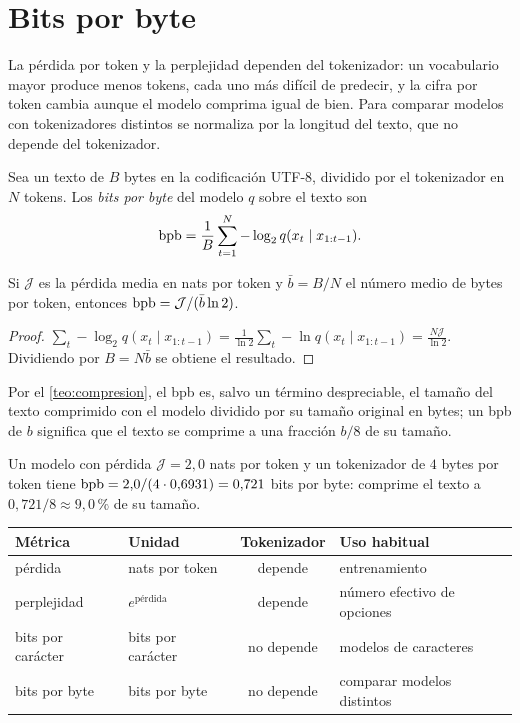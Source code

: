 \section{Bits por byte}

La pérdida por token y la perplejidad dependen del tokenizador: un vocabulario mayor produce menos tokens, cada uno más difícil de predecir, y la cifra por token cambia aunque el modelo comprima igual de bien. Para comparar modelos con tokenizadores distintos se normaliza por la longitud del texto, que no depende del tokenizador.

\begin{definicion}\label{def:bpb}
Sea un texto de $B$ bytes en la codificación UTF-8, dividido por el tokenizador en $N$ tokens. Los \emph{bits por byte} del modelo $q$ sobre el texto son
\[
\operatorname{bpb}=\frac{1}{B}\sum_{t=1}^{N}-\log_2 q(x_t\mid x_{1:t-1}).
\]
\end{definicion}

\begin{proposicion}\label{prop:bpb}
Si $\mathcal{J}$ es la pérdida media en nats por token y $\bar b=B/N$ el número medio de bytes por token, entonces $\operatorname{bpb}=\mathcal{J}/(\bar b\ln 2)$.
\end{proposicion}

\begin{proof}
$\sum_t-\log_2q(x_t\mid x_{1:t-1})=\frac{1}{\ln 2}\sum_t-\ln q(x_t\mid x_{1:t-1})=\frac{N\mathcal{J}}{\ln 2}$. Dividiendo por $B=N\bar b$ se obtiene el resultado.
\end{proof}

Por el \cref{teo:compresion}, el bpb es, salvo un término despreciable, el tamaño del texto comprimido con el modelo dividido por su tamaño original en bytes; un bpb de $b$ significa que el texto se comprime a una fracción $b/8$ de su tamaño.

\begin{ejemplo}\label{ej:bpb}
Un modelo con pérdida $\mathcal{J}=2{,}0$ nats por token y un tokenizador de $4$ bytes por token tiene $\operatorname{bpb}=2{,}0/(4\cdot 0{,}6931)=0{,}721$ bits por byte: comprime el texto a $0{,}721/8\approx 9{,}0\,\%$ de su tamaño.
\end{ejemplo}

\begin{center}
\begin{tabular}{@{}llcl@{}}
\toprule
Métrica & Unidad & Tokenizador & Uso habitual \\
\midrule
pérdida & nats por token & depende & entrenamiento \\
perplejidad & $e^{\text{pérdida}}$ & depende & número efectivo de opciones \\
bits por carácter & bits por carácter & no depende & modelos de caracteres \\
bits por byte & bits por byte & no depende & comparar modelos distintos \\
\bottomrule
\end{tabular}
\end{center}

